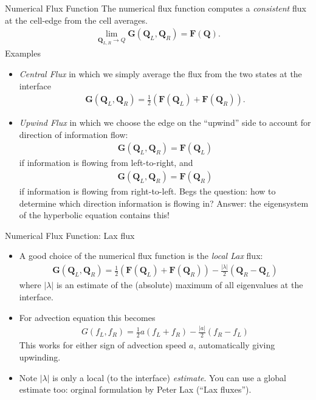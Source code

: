 \documentclass[aspectratio=169]{beamer}
\newcommand{\mypause}{}
\newcommand{\mvec}[1]{\mathbf{#1}}
\begin{document}
\begin{frame}{Numerical Flux Function}
  \footnotesize%
  The numerical flux function computes a \emph{consistent} flux at the
  cell-edge from the cell averages.
  \begin{align*}
    \lim_{\mvec{Q}_{L,R}\rightarrow Q} \mvec{G}(\mvec{Q}_L,\mvec{Q}_R) = \mvec{F}(\mvec{Q}).
  \end{align*}
  Examples
  \begin{itemize}
  \item \emph{Central Flux} in which we simply average the flux from
    the two states at the interface
    \begin{align*}
      \mvec{G}(\mvec{Q}_L,\mvec{Q}_R) = \frac{1}{2}
      \left( \mvec{F}(\mvec{Q}_L) + \mvec{F}(\mvec{Q}_R) \right) .
    \end{align*}
  \item \emph{Upwind Flux} in which we choose the edge on the
    ``upwind'' side to account for direction of information flow:
    \begin{align*}
      \mvec{G}(\mvec{Q}_L,\mvec{Q}_R) = \mvec{F}(\mvec{Q}_L)
    \end{align*}
    if information is flowing from left-to-right, and
    \begin{align*}
      \mvec{G}(\mvec{Q}_L,\mvec{Q}_R) = \mvec{F}(\mvec{Q}_R)
    \end{align*}
    if information is flowing from right-to-left. Begs the question:
    how to determine which direction information is flowing in?
    Answer: the eigensystem of the hyperbolic equation contains this!
  \end{itemize} 
\end{frame}

\begin{frame}{Numerical Flux Function: Lax flux}
  \small%
  \begin{itemize}
  \item A good choice of the numerical flux function is the
    \emph{local Lax} flux:
    \begin{align*}
      \mvec{G}(\mvec{Q}_L,\mvec{Q}_R) = \frac{1}{2}
      \left( \mvec{F}(\mvec{Q}_L) + \mvec{F}(\mvec{Q}_R) \right)
      - \frac{|\lambda|}{2}( \mvec{Q}_R - \mvec{Q}_L )
    \end{align*}
    where $|\lambda|$ is an estimate of the (absolute) maximum of all
    eigenvalues at the interface.%
    \mypause%
  \item   For advection equation this becomes
    \begin{align*}
      G(f_L,f_R) = \frac{1}{2} a ( f_L + f_R ) - \frac{|a|}{2}( f_R - f_L )
    \end{align*}
    This works for either sign of advection speed $a$, automatically
    giving upwinding.%
    \mypause%
  \item Note $|\lambda|$ is only a local (to the interface)
    \emph{estimate}. You can use a global estimate too: orginal
    formulation by Peter Lax (``Lax fluxes'').
  \end{itemize}

\end{frame}
\end{document}
